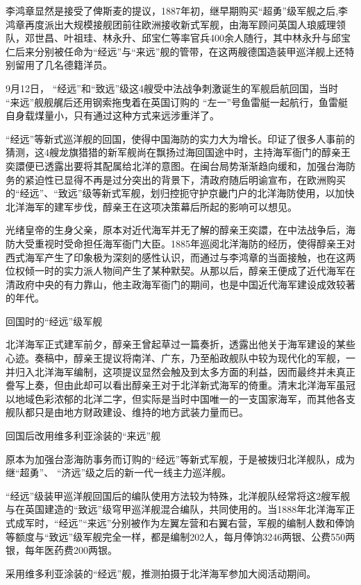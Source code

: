 \documentclass[12pt,UTF8]{ctexbook}
\begin{document}
李鸿章显然是接受了俾斯麦的提议，1887年初，继早期购买“超勇”级军舰之后,李鸿章再度派出大规模接舰团前往欧洲接收新式军舰，由海军顾问英国人琅威理领队，邓世昌、叶祖珪、林永升、邱宝仁等率官兵400余人随行，其中林永升与邱宝仁后来分别被任命为“经远”与“来远”舰的管带，在这两艘德国造装甲巡洋舰上还特别留用了几名德籍洋员。

9月12日， “经远”和“致远”级这4艘受中法战争刺激诞生的军舰启航回国，当时 “来远”舰舰艉后还用钢索拖曳着在英国订购的 “左一”号鱼雷艇一起航行，鱼雷艇自身载煤量小，只有通过这种方式来远涉重洋了。

“经远”等新式巡洋舰的回国，使得中国海防的实力大为增长。印证了很多人事前的猜测，这4艘龙旗猎猎的新军舰尚在飘扬过海回国途中时，主持海军衙门的醇亲王奕譞便已透露出要将其配属给北洋的意图。在闽台局势渐渐趋向缓和，加强台海防务的紧迫性已显得不再是过分突出的背景下，清政府随后明谕宣布，在欧洲购买的“经远”、“致远”级等新式军舰，划归控扼守护京畿门户的北洋海防使用，以加快北洋海军的建军步伐，醇亲王在这项决策幕后所起的影响可以想见。

光绪皇帝的生身父亲，原本对近代海军并无了解的醇亲王奕譞，在中法战争后，海防大受重视时受命担任海军衙门大臣。1885年巡阅北洋海防的经历，使得醇亲王对西式海军产生了印象极为深刻的感性认识，而通过与李鸿章的当面接触，也在这两位权倾一时的实力派人物间产生了某种默契。从那以后，醇亲王便成了近代海军在清政府中央的有力靠山，他主政海军衙门的期间，也是中国近代海军建设成效较著的年代。

回国时的“经远”级军舰

北洋海军正式建军前夕，醇亲王曾起草过一篇奏折，透露出他关于海军建设的某些心迹。奏稿中，醇亲王提议将南洋、广东，乃至船政舰队中较为现代化的军舰，一并归入北洋海军编制，这项提议显然会触及到太多方面的利益，因而最终并未真正誊写上奏，但由此却可以看出醇亲王对于北洋新式海军的倚重。清末北洋海军虽冠以地域色彩浓郁的北洋二字，但实际是当时中国唯一的一支国家海军，而其他各支舰队都只是由地方财政建设、维持的地方武装力量而已。

回国后改用维多利亚涂装的“来远”舰

原本为加强台澎海防事务而订购的“经远”等新式军舰，于是被拨归北洋舰队，成为继“超勇”、 “济远”级之后的新一代一线主力巡洋舰。

“经远”级装甲巡洋舰回国后的编队使用方法较为特殊，北洋舰队经常将这2艘军舰与在英国建造的“致远”级穹甲巡洋舰混合编队，共同使用的。当1888年北洋海军正式成军时，“经远”“来远”分别被作为左翼左营和右翼右营，军舰的编制人数和俸饷等额度与“致远”级军舰完全一样，都是编制202人，每月俸饷3246两银、公费550两银，每年医药费200两银。

采用维多利亚涂装的“经远”舰，推测拍摄于北洋海军参加大阅活动期间。
\end{document}
